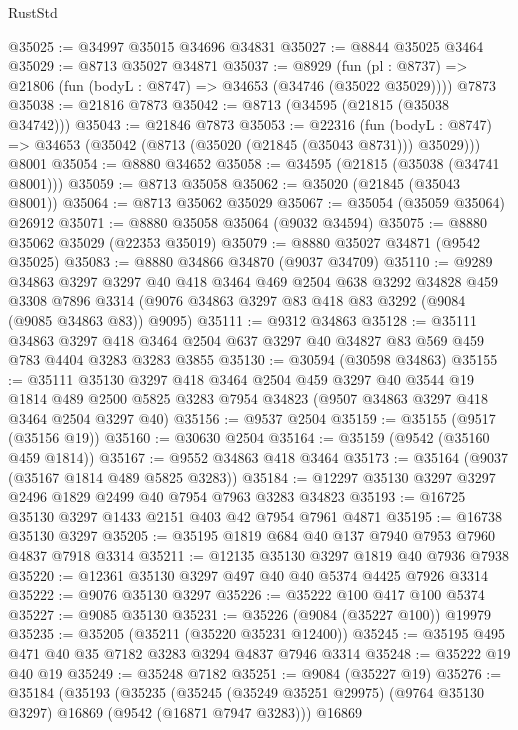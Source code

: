 \begin{lexlean}{RustStd}
\begin{coremodule}
@35025 := @34997 @35015 @34696 @34831
@35027 := @8844 @35025 @3464
@35029 := @8713 @35027 @34871
@35037 := @8929
    (fun (pl : @8737) => @21806 (fun (bodyL : @8747) => @34653 (@34746 (@35022 @35029))))
    @7873
@35038 := @21816 @7873
@35042 := @8713 (@34595 (@21815 (@35038 @34742)))
@35043 := @21846 @7873
@35053 := @22316
    (fun (bodyL : @8747) => @34653 (@35042 (@8713 (@35020 (@21845 (@35043 @8731))) @35029)))
    @8001
@35054 := @8880 @34652
@35058 := @34595 (@21815 (@35038 (@34741 @8001)))
@35059 := @8713 @35058
@35062 := @35020 (@21845 (@35043 @8001))
@35064 := @8713 @35062 @35029
@35067 := @35054 (@35059 @35064) @26912
@35071 := @8880 @35058 @35064 (@9032 @34594)
@35075 := @8880 @35062 @35029 (@22353 @35019)
@35079 := @8880 @35027 @34871 (@9542 @35025)
@35083 := @8880 @34866 @34870 (@9037 @34709)
@35110 := @9289
    @34863
    @3297
    @3297
    @40
    @418
    @3464
    @469
    @2504
    @638
    @3292
    @34828
    @459
    @3308
    @7896
    @3314
    (@9076 @34863 @3297 @83 @418 @83 @3292 (@9084 (@9085 @34863 @83)) @9095)
@35111 := @9312 @34863
@35128 := @35111
    @34863
    @3297
    @418
    @3464
    @2504
    @637
    @3297
    @40
    @34827
    @83
    @569
    @459
    @783
    @4404
    @3283
    @3283
    @3855
@35130 := @30594 (@30598 @34863)
@35155 := @35111
    @35130
    @3297
    @418
    @3464
    @2504
    @459
    @3297
    @40
    @3544
    @19
    @1814
    @489
    @2500
    @5825
    @3283
    @7954
    @34823
    (@9507 @34863 @3297 @418 @3464 @2504 @3297 @40)
@35156 := @9537 @2504
@35159 := @35155 (@9517 (@35156 @19))
@35160 := @30630 @2504
@35164 := @35159 (@9542 (@35160 @459 @1814))
@35167 := @9552 @34863 @418 @3464
@35173 := @35164 (@9037 (@35167 @1814 @489 @5825 @3283))
@35184 := @12297 @35130 @3297 @3297 @2496 @1829 @2499 @40 @7954 @7963 @3283 @34823
@35193 := @16725 @35130 @3297 @1433 @2151 @403 @42 @7954 @7961 @4871
@35195 := @16738 @35130 @3297
@35205 := @35195 @1819 @684 @40 @137 @7940 @7953 @7960 @4837 @7918 @3314
@35211 := @12135 @35130 @3297 @1819 @40 @7936 @7938
@35220 := @12361 @35130 @3297 @497 @40 @40 @5374 @4425 @7926 @3314
@35222 := @9076 @35130 @3297
@35226 := @35222 @100 @417 @100 @5374
@35227 := @9085 @35130
@35231 := @35226 (@9084 (@35227 @100)) @19979
@35235 := @35205 (@35211 (@35220 @35231 @12400))
@35245 := @35195 @495 @471 @40 @35 @7182 @3283 @3294 @4837 @7946 @3314
@35248 := @35222 @19 @40 @19
@35249 := @35248 @7182
@35251 := @9084 (@35227 @19)
@35276 := @35184
    (@35193
      (@35235
        (@35245 (@35249 @35251 @29975) (@9764 @35130 @3297) @16869 (@9542 (@16871 @7947 @3283)))
        @16869

\end{coremodule}
\end{lexlean}
